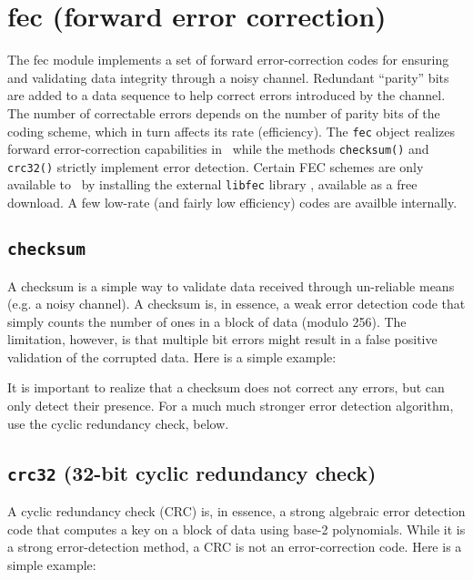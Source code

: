 % 
%

\newpage
\section{fec (forward error correction)}
\label{module:fec}
The fec module implements a set of forward error-correction codes for
ensuring and validating data integrity through a noisy channel.
Redundant ``parity'' bits are added to a data sequence to help correct
errors introduced by the channel.
The number of correctable errors depends on the number of parity bits of the
coding scheme, which in turn affects its rate (efficiency).
The {\tt fec} object realizes forward error-correction capabilities in
\liquid\ while the methods {\tt checksum()} and {\tt crc32()} strictly
implement error detection.
Certain FEC schemes are only available to \liquid\ by installing the external
{\tt libfec} library \cite{libfec:web}, available as a free download.
A few low-rate (and fairly low efficiency) codes are availble internally.


\subsection{{\tt checksum}}
\label{module:fec:checksum}
A checksum is a simple way to validate data received through un-reliable means
(e.g. a noisy channel).
A checksum is, in essence, a weak error detection code that simply counts the
number of ones in a block of data (modulo 256).
The limitation, however, is that multiple bit errors might result in a false
positive validation of the corrupted data.
Here is a simple example:
%

%
It is important to realize that a checksum does not correct any errors, but
can only detect their presence.
For a much much stronger error detection algorithm, use the cyclic redundancy
check, below.

\subsection{{\tt crc32} (32-bit cyclic redundancy check)}
\label{module:fec:crc32}
A cyclic redundancy check (CRC) is, in essence, a strong algebraic error
detection code that computes a key on a block of data using base-2
polynomials.
While it is a strong error-detection method, a CRC is not an error-correction
code.
Here is a simple example:
%


